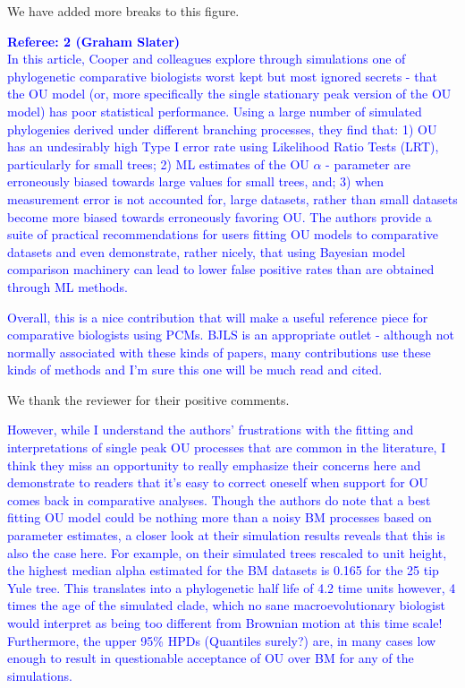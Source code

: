 \documentclass[12pt]{letter}
\begin{document}
\begin{letter}{}
We have added more breaks to this figure.

\textcolor{blue}{\textbf{Referee: 2 (Graham Slater)}\\
In this article, Cooper and colleagues explore through simulations one of phylogenetic comparative biologists worst kept but most ignored secrets - that the OU model (or, more specifically the single stationary peak version of the OU model) has poor statistical performance. Using a large number of simulated phylogenies derived under different branching processes, they find that: 1) OU has an undesirably high Type I error rate using Likelihood Ratio Tests (LRT), particularly for small trees; 2) ML estimates of the OU $\alpha$ - parameter are erroneously biased towards large values for small trees, and; 3) when measurement error is not accounted for, large datasets, rather than small datasets become more biased towards erroneously favoring OU. The authors provide a suite of practical recommendations for users fitting OU models to comparative datasets and even demonstrate, rather nicely, that using Bayesian model comparison machinery can lead to lower false positive rates than are obtained through ML methods.}

\textcolor{blue}{Overall, this is a nice contribution that will make a useful reference piece for comparative biologists using PCMs. BJLS is an appropriate outlet - although not normally associated with these kinds of papers, many contributions use these kinds of methods and I'm sure this one will be much read and cited.}

We thank the reviewer for their positive comments.

\textcolor{blue}{However, while I understand the authors’ frustrations with the fitting and interpretations of single peak OU processes that are common in the literature, I think they miss an opportunity to really emphasize their concerns here and demonstrate to readers that it's easy to correct oneself when support for OU comes back in comparative analyses. Though the authors do note that a best fitting OU model could be nothing more than a noisy BM processes based on parameter estimates, a closer look at their simulation results reveals that this is also the case here. For example, on their simulated trees rescaled to unit height, the highest median alpha estimated for the BM datasets is 0.165 for the 25 tip Yule tree. This translates into a phylogenetic half life of 4.2 time units however, 4 times the age of the simulated clade, which no sane macroevolutionary biologist would interpret as being too different from Brownian motion at this time scale! Furthermore, the upper 95\% HPDs (Quantiles surely?) are, in many cases low enough to result in questionable acceptance of OU over BM for any of the simulations.}


\end{letter}
\end{document}
